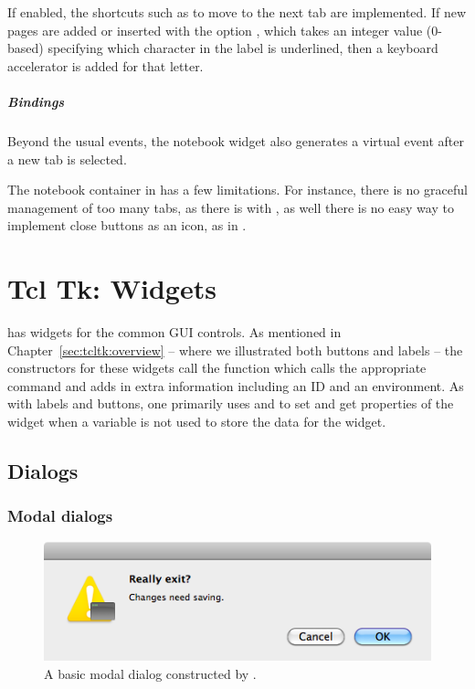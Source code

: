 If enabled, the shortcuts such as  to move to the
next tab are implemented. If new pages are added or inserted with the
option , which takes an integer value
(0-based) specifying which character in the label is underlined, then
a keyboard accelerator is added for that letter.

\paragraph{Bindings}
Beyond the usual events, the notebook widget also generates a
 virtual event after a new tab is
selected.

The notebook container in \TK\/ has a few limitations. For instance,
there is no graceful management of too many tabs, as there is with
\GTK, as well there is no easy way to implement close buttons as an
icon, as in \Qt.


\chapter{Tcl Tk: Widgets}
\label{sec:tcltk:widgets}
\Tk\/ has widgets for the common GUI controls. As mentioned in
Chapter~\ref{sec:tcltk:overview} -- where we illustrated both buttons
and labels -- the constructors for these widgets call the function
 which calls the appropriate \TK\/ command and adds
in extra information including an ID and an environment. As with
labels and buttons, one primarily uses  and
 to set and get properties of the widget when a
\TCL\/ variable is not used to store the data for the widget.



\section{Dialogs}
\label{sec:tcltk:dialogs}
\subsection{Modal dialogs}
\label{sec:modal-dialogs}

\begin{figure}
  \centering
  \includegraphics[width=.6\textwidth]{fig-tcltk-confirm-dialog.png}
  \caption{A basic modal dialog constructed by .}
  \label{fig:fig-tcltk-confirm-dialog}
\end{figure}

